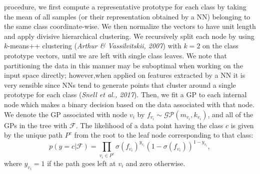 \documentclass[preprint,11pt]{elsarticle}
\begin{document}
        procedure, we first compute a representative prototype for
        each class by taking the mean of all samples (or their representation
        obtained by a NN) belonging to the same class
        coordinate-wise. We then normalize the vectors to have
        unit length and apply divisive hierarchical clustering. We
        recursively split each node by using $k$-means++ clustering
        (\textit{Arthur \& Vassilvitskii, 2007}\cite{arthur2007k}) with $k = 2$ on the class prototype
        vectors, until we are left with single class leaves. We
        note that partitioning the data in this manner may be suboptimal
        when working on the input space directly; however,when applied on features extracted by a NN it is very sensible
        since NNs tend to generate points that cluster around a
        single prototype for each class (\textit{Snell et al., 2017}\cite{snell2017prototypical}). Then, we
        fit a GP to each internal node which makes a binary decision
        based on the data associated with that node. We denote the
        GP associated with node $v_i$ by $f_{v_i}\sim \mathcal{GP}(m_{v_i} , k_{v_i} )$, and all
        of the GPs in the tree with $\mathcal{F}$. The likelihood of a data point
        having the class $c$ is given by the unique path $P^c$ from the
        root to the leaf node corresponding to that class:
        \begin{equation}
            p( y=c|\bm{\mathcal{F}} ) = \prod_{v_i \in P^c}\sigma( f_{v_i})^{y_{v_i}}( 1- \sigma( f_{v_i}))^{ 1 - y_{v_i}} , \label{eq:eq9}
        \end{equation}
        where $y_{v_i} = 1$ if the path goes left at $v_i$ and zero otherwise.
        
\end{document}

